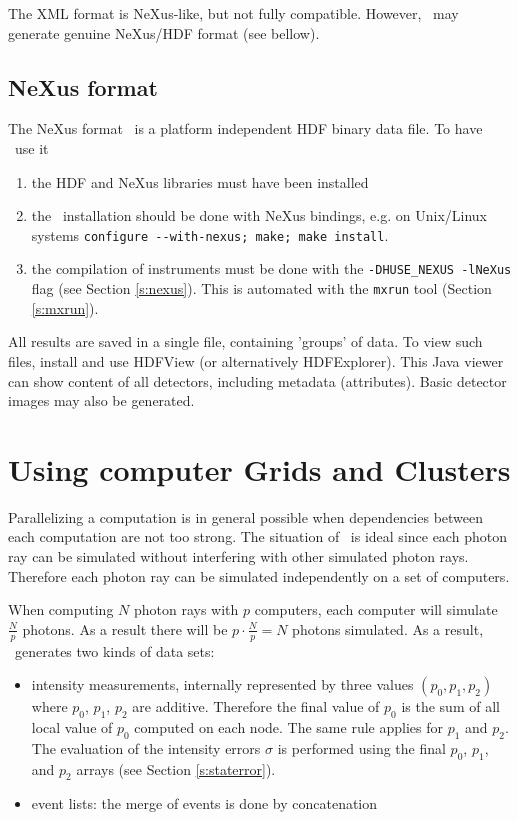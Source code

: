 The XML format is NeXus-like, but not fully compatible. However, \MCX\ may generate genuine NeXus/HDF format (see bellow).

\subsection{NeXus format}
  
\label{r:nexus}

The NeXus format~\cite{nexus_webpage} is a platform independent HDF binary data file. To have \MCX\ use it
\begin{enumerate}
\item the HDF and NeXus libraries must have been installed
\item the \MCX\ installation should be done with NeXus bindings, e.g. on Unix/Linux systems \verb+configure --with-nexus; make; make install+.
\item  the compilation of instruments must be done with the \verb+-DHUSE_NEXUS -lNeXus+ flag (see Section \ref{s:nexus}). This is automated with the \verb+mxrun+ tool (Section \ref{s:mxrun}).
\end{enumerate}
All results are saved in a single file, containing 'groups' of data. To view such files, install and use HDFView (or alternatively HDFExplorer). This Java viewer can show content of all detectors, including metadata (attributes). Basic detector images may also be generated.

\section{Using computer Grids and Clusters}
\label{s:run-mpi}

Parallelizing a computation is in general possible when dependencies between
  each computation are not too strong. The situation of \MCX\ is
  ideal since each photon ray can be simulated without interfering with
  other simulated photon rays. Therefore each photon ray can be simulated
  independently on a set of computers.
  
When computing $N$ photon rays with
$p$ computers, each computer will simulate $\frac{N}{p}$
photons. As a result there will be $p \cdot \frac{N}{p} = N$
photons simulated. As a result, \MCX\ generates two kinds of data sets:
\begin{itemize}
\item intensity measurements, internally represented by three
  values $(p_0, p_1, p_2)$ where $p_0$, $p_1$, $p_2$ are
  additive. Therefore the final value of $p_0$ is the sum of all
  local value of  $p_0$ computed on each node. The same rule applies
  for $p_1$ and $p_2$. The evaluation of the intensity errors $\sigma$
  is performed using the final $p_0$, $p_1$, and $p_2$ arrays (see Section \ref{s:staterror}).
\item event lists: the merge of events is done by concatenation
\end{itemize}

